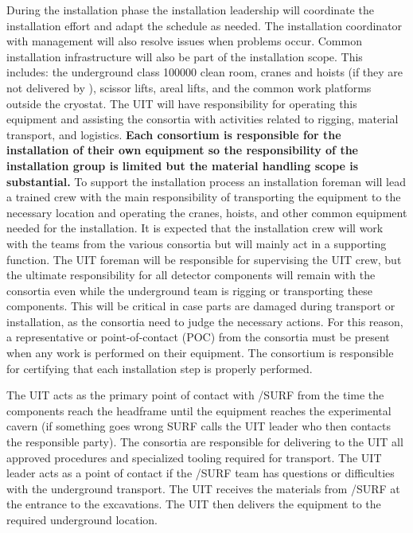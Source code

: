 During the installation phase the installation leadership will
coordinate the  installation effort and adapt the schedule as
needed. The installation coordinator with management will also resolve
issues when problems occur. Common installation infrastructure will
also be part of the installation scope. This includes: the underground
class \num{100000} clean room, cranes and hoists (if they are not delivered by
), scissor lifts, areal lifts, and the common work platforms
outside the cryostat. The UIT will have responsibility for operating
this equipment and assisting the consortia with activities related to
rigging, material transport, and logistics. {\bf Each consortium is
  responsible for the installation of their own equipment so the
  responsibility of the installation group is limited but the material
  handling scope is substantial.} To support the installation process
an installation foreman will lead a trained crew with the main
responsibility of transporting the equipment to the necessary location
and operating the cranes, hoists, and other common equipment needed
for the installation. It is expected that the installation crew will
work with the teams from the various consortia but will mainly act in
a supporting function. The UIT foreman will be responsible for
supervising the UIT crew, but the ultimate responsibility for all
detector components will remain with the consortia even while the
underground team is rigging or transporting these components.  This
will be critical in case parts are damaged during transport or
installation, as the consortia need to judge the necessary
actions. For this reason, a representative or point-of-contact (POC)
from the consortia must be present when any work is performed on their
equipment. The consortium is responsible for certifying that each
installation step is properly performed.

The UIT acts as the primary point of contact with /SURF from the
time the components reach the headframe until the equipment reaches
the experimental cavern (if something goes wrong SURF calls the UIT
leader who then contacts the responsible party). The consortia are
responsible for delivering to the UIT all approved procedures and
specialized tooling required for transport. The UIT leader acts as a
point of contact if the /SURF team has questions or difficulties
with the underground transport.  The UIT receives the materials from
/SURF at the entrance to the  excavations. The UIT then
delivers the equipment to the required underground location.

